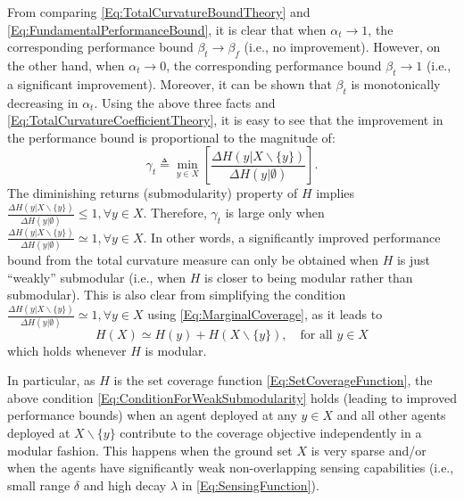 \documentclass[letterpaper, 10 pt, conference]{ieeeconf}
\begin{document}
From comparing \eqref{Eq:TotalCurvatureBoundTheory} and \eqref{Eq:FundamentalPerformanceBound}, it is clear that when $\alpha_t\rightarrow 1$, the corresponding performance bound $\beta_t\rightarrow\beta_f$ (i.e., no improvement). However, on the other hand, when $\alpha_t\rightarrow 0$, the corresponding performance bound $\beta_t\rightarrow 1$ (i.e., a significant improvement). Moreover, it can be shown that $\beta_t$ is monotonically decreasing in $\alpha_t$. Using the above three facts and \eqref{Eq:TotalCurvatureCoefficientTheory}, it is easy to see that the improvement in the performance bound is proportional to the magnitude of:
\begin{equation}\label{Eq:TotolCurvatureGamma}
    \gamma_t \triangleq \min_{y \in X}\left[\frac{\Delta H(y \vert X \backslash \{y\})}{\Delta H(y \vert \emptyset)}\right].
\end{equation}
The diminishing returns (submodularity) property of $H$ implies $\frac{\Delta H(y \vert X \backslash \{y\})}{\Delta H(y \vert \emptyset)} \leq 1, \forall y\in X$. Therefore, $\gamma_t$ is large only when $\frac{\Delta H(y \vert X \backslash \{y\})}{\Delta H(y \vert \emptyset)} \simeq 1, \forall y\in X$. In other words, a significantly improved performance bound from the total curvature measure can only be obtained when $H$ is just ``weakly'' submodular (i.e., when $H$ is closer to being modular rather than submodular). This is also clear from simplifying the condition $\frac{\Delta H(y \vert X \backslash \{y\})}{\Delta H(y \vert \emptyset)} \simeq 1, \forall y \in X$ using \eqref{Eq:MarginalCoverage}, as it leads to
\begin{equation}
\label{Eq:ConditionForWeakSubmodularity}
     H(X) \simeq H(y) + H(X\backslash \{y\}), \quad \mbox{for all } y\in X
\end{equation}
which holds whenever $H$ is modular. 

In particular, as $H$ is the set coverage function \eqref{Eq:SetCoverageFunction}, the above condition \eqref{Eq:ConditionForWeakSubmodularity} holds (leading to improved performance bounds) when an agent deployed at any $y\in X$ and all other agents deployed at $X \backslash \{y\}$ contribute to the coverage objective independently in a modular fashion. This happens when the ground set $X$ is very sparse and/or when the agents have significantly weak non-overlapping sensing capabilities (i.e., small range $\delta$ and high decay $\lambda$ in \eqref{Eq:SensingFunction}). 
\end{document}

